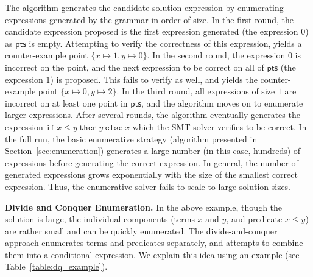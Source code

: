 \documentclass{llncs}
\newcommand\Points{\mathsf{pts}}
\newcommand\ITE[3]{\mathtt{if}~#1~\mathtt{then}~#2~\mathtt{else}~#3}
\renewcommand{\paragraph}[1]{\par\noindent\textbf{#1.}}
\begin{document}
The algorithm generates the candidate solution expression by
enumerating expressions generated by the grammar in order of size.
In the first round, the candidate expression proposed is the first
expression generated (the expression $0$) as $\Points$ is empty.
Attempting to verify the correctness of this
expression, yields a counter-example point $\{ x \mapsto 1, y \mapsto
0 \}$.  In the second round, the expression $0$ is incorrect on the
point, and the next expression to be correct on all of $\Points$ (the
expression $1$)
is proposed.  This fails to verify as well, and yields the
counter-example point $\{ x \mapsto 0, y \mapsto 2 \}$. In the third
round, all expressions of size $1$ are incorrect on at least one point
in $\Points$, and the algorithm moves on to enumerate larger
expressions.
After several rounds, the algorithm eventually generates the expression
$\ITE{x \leq y}{y}{x}$ which the SMT solver verifies to be correct.
In the full run, the basic enumerative strategy (algorithm presented in
Section~\ref{sec:enumeration}) generates a large number (in this case,
hundreds) of expressions before generating the correct expression.
In general, the number of generated expressions grows exponentially with
the size of the smallest correct expression. 
Thus, the enumerative solver fails to scale to large solution sizes.


\paragraph{Divide and Conquer Enumeration}
In the above example, though the solution is large, the
individual components (terms $x$ and $y$, and predicate $x \leq
y$) are rather small and can be quickly enumerated.
%
The divide-and-conquer approach enumerates terms and predicates
separately, and attempts to combine them into a conditional expression.
We explain this idea using an example (see Table~\ref{table:dq_example}).
\end{document}

